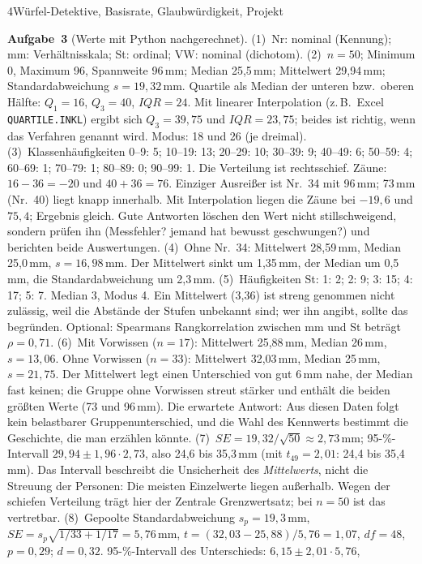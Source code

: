 \begin{uebungsblattb}{4}{Würfel-Detektive, Basisrate, Glaubwürdigkeit, Projekt}
\begin{lehrhinweis}[Erwartungshorizont]
\textbf{Aufgabe~3} (Werte mit Python nachgerechnet).
(1)~Nr: nominal (Kennung); mm: Verhältnisskala; St: ordinal; VW: nominal
(dichotom).
(2)~$n=50$; Minimum 0, Maximum 96, Spannweite 96\,mm; Median 25,5\,mm;
Mittelwert 29,94\,mm; Standardabweichung $s=19{,}32$\,mm. Quartile als
Median der unteren bzw.\ oberen Hälfte: $Q_1=16$, $Q_3=40$,
$\mathit{IQR}=24$. Mit linearer Interpolation (z.\,B.\ Excel
\texttt{QUARTILE.INKL}) ergibt sich $Q_3=39{,}75$ und
$\mathit{IQR}=23{,}75$; beides ist richtig, wenn das Verfahren genannt
wird. Modus: 18 und 26 (je dreimal).
(3)~Klassenhäufigkeiten 0--9: 5; 10--19: 13; 20--29: 10; 30--39: 9;
40--49: 6; 50--59: 4; 60--69: 1; 70--79: 1; 80--89: 0; 90--99: 1. Die
Verteilung ist rechtsschief. Zäune: $16-36=-20$ und $40+36=76$. Einziger
Ausreißer ist Nr.~34 mit 96\,mm; 73\,mm (Nr.~40) liegt knapp innerhalb.
Mit Interpolation liegen die Zäune bei $-19{,}6$ und $75{,}4$; Ergebnis
gleich. Gute Antworten löschen den Wert nicht stillschweigend, sondern
prüfen ihn (Messfehler? jemand hat bewusst geschwungen?) und berichten
beide Auswertungen.
(4)~Ohne Nr.~34: Mittelwert 28,59\,mm, Median 25,0\,mm, $s=16{,}98$\,mm.
Der Mittelwert sinkt um 1,35\,mm, der Median um 0,5\,mm, die
Standardabweichung um 2,3\,mm.
(5)~Häufigkeiten St: 1: 2; 2: 9; 3: 15; 4: 17; 5: 7. Median 3, Modus 4.
Ein Mittelwert (3,36) ist streng genommen nicht zulässig, weil die
Abstände der Stufen unbekannt sind; wer ihn angibt, sollte das begründen.
Optional: Spearmans Rangkorrelation zwischen mm und St beträgt
$\rho=0{,}71$.
(6)~Mit Vorwissen ($n=17$): Mittelwert 25,88\,mm, Median 26\,mm,
$s=13{,}06$. Ohne Vorwissen ($n=33$): Mittelwert 32,03\,mm, Median
25\,mm, $s=21{,}75$. Der Mittelwert legt einen Unterschied von gut 6\,mm
nahe, der Median fast keinen; die Gruppe ohne Vorwissen streut stärker
und enthält die beiden größten Werte (73 und 96\,mm). Die erwartete
Antwort: Aus diesen Daten folgt kein belastbarer Gruppenunterschied, und
die Wahl des Kennwerts bestimmt die Geschichte, die man erzählen könnte.
(7)~$\mathit{SE}=19{,}32/\sqrt{50}\approx2{,}73$\,mm; 95-\%-Intervall
$29{,}94\pm1{,}96\cdot2{,}73$, also 24,6 bis 35,3\,mm (mit $t_{49}=2{,}01$:
24,4 bis 35,4\,mm). Das Intervall beschreibt die Unsicherheit des
\emph{Mittelwerts}, nicht die Streuung der Personen: Die meisten
Einzelwerte liegen außerhalb. Wegen der schiefen Verteilung trägt hier der
Zentrale Grenzwertsatz; bei $n=50$ ist das vertretbar.
(8)~Gepoolte Standardabweichung $s_p=19{,}3$\,mm, $\mathit{SE}=s_p\sqrt{1/33+1/17}=5{,}76$\,mm,
$t=(32{,}03-25{,}88)/5{,}76=1{,}07$, $\mathit{df}=48$, $p=0{,}29$;
$d=0{,}32$. 95-\%-Intervall des Unterschieds: $6{,}15\pm2{,}01\cdot5{,}76$,

\end{lehrhinweis}
\end{uebungsblattb}
